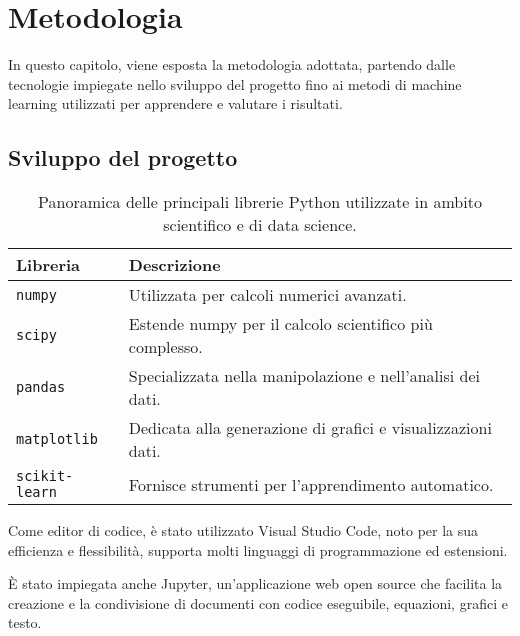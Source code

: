 \pagestyle{fancy}

\fancyhf{}

\fancyfoot[C]{\thepage}


\chapter{Metodologia}

\large

In questo capitolo, viene esposta la metodologia adottata, partendo dalle tecnologie impiegate nello sviluppo del progetto fino ai metodi di machine learning utilizzati per apprendere e valutare i risultati.

\section{Sviluppo del progetto}

\begin{table}[t]
    \centering
    \begin{tabular}{|ll|}
        \hline
        \textbf{Libreria}
        & \textbf{Descrizione} \\
        \hline
        \texttt{numpy}
        & Utilizzata per calcoli numerici avanzati. \\
        \texttt{scipy}
        & Estende numpy per il calcolo scientifico più complesso. \\
        \texttt{pandas}
        & Specializzata nella manipolazione e nell'analisi dei dati. \\
        \texttt{matplotlib}
        & Dedicata alla generazione di grafici e visualizzazioni dati. \\
        \texttt{scikit-learn}
        & Fornisce strumenti per l'apprendimento automatico. \\
        \hline
    \end{tabular}
    \caption{Panoramica delle principali librerie Python utilizzate in ambito scientifico e di data science.}
    \label{tab:5-1}
\end{table}

Come editor di codice, è stato utilizzato Visual Studio Code, noto per la sua efficienza e flessibilità, supporta molti linguaggi di programmazione ed estensioni.

\bigskip

È stato impiegata anche Jupyter, un'applicazione web open source che facilita la creazione e la condivisione di documenti con codice eseguibile, equazioni, grafici e testo.


